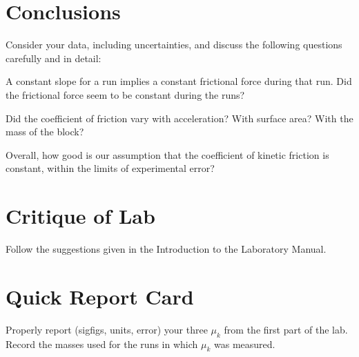 \section*{Conclusions}
Consider your data, including uncertainties, and discuss the
following questions carefully and in detail:

A constant slope for a run implies a constant frictional
force during that run.  Did the frictional force seem to be constant during the runs?

Did the coefficient of friction vary
with acceleration? With surface area? With the mass of the block?

Overall, how good is our assumption that the coefficient of kinetic
friction is constant, within the limits of experimental error?


\section*{Critique of Lab}
     Follow the suggestions given in the Introduction to the
Laboratory Manual.

\section*{Quick Report Card}
Properly report (sigfigs, units, error) your three $\mu_k$ from the first part of the lab.
Record the masses used for the runs in which $\mu_k$ was measured.

\bigskip
\bigskip
\bigskip

